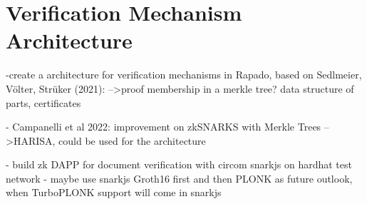 \section{Verification Mechanism Architecture}
-create a architecture for verification mechanisms in Rapado, based on Sedlmeier, Völter, Strüker (2021):
-->proof membership in a merkle tree? data structure of parts, certificates

- Campanelli et al 2022: improvement on zkSNARKS with Merkle Trees -->HARISA, could be used for the architecture

- build zk DAPP for document verification with circom snarkjs on hardhat test network
- maybe use snarkjs Groth16 first and then PLONK as future outlook, when TurboPLONK support will come in snarkjs
